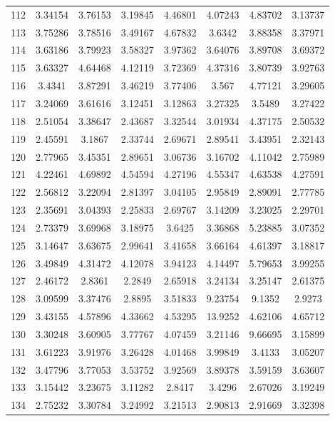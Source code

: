 \begin{center}
\begin{longtable}{cccccccc}
112 & 3.34154 & 3.76153 & 3.19845 & 4.46801 & 4.07243 & 4.83702 & 3.13737\\
113 & 3.75286 & 3.78516 & 3.49167 & 4.67832 & 3.6342 & 3.88358 & 3.37971\\
114 & 3.63186 & 3.79923 & 3.58327 & 3.97362 & 3.64076 & 3.89708 & 3.69372\\
115 & 3.63327 & 4.64468 & 4.12119 & 3.72369 & 4.37316 & 3.80739 & 3.92763\\
116 & 3.4341 & 3.87291 & 3.46219 & 3.77406 & 3.567 & 4.77121 & 3.29605\\
117 & 3.24069 & 3.61616 & 3.12451 & 3.12863 & 3.27325 & 3.5489 & 3.27422\\
118 & 2.51054 & 3.38647 & 2.43687 & 3.32544 & 3.01934 & 4.37175 & 2.50532\\
119 & 2.45591 & 3.1867 & 2.33744 & 2.69671 & 2.89541 & 3.43951 & 2.32143\\
120 & 2.77965 & 3.45351 & 2.89651 & 3.06736 & 3.16702 & 4.11042 & 2.75989\\
121 & 4.22461 & 4.69892 & 4.54594 & 4.27196 & 4.55347 & 4.63538 & 4.27591\\
122 & 2.56812 & 3.22094 & 2.81397 & 3.04105 & 2.95849 & 2.89091 & 2.77785\\
123 & 2.35691 & 3.04393 & 2.25833 & 2.69767 & 3.14209 & 3.23025 & 2.29701\\
124 & 2.73379 & 3.69968 & 3.18975 & 3.6425 & 3.36868 & 5.23885 & 3.07352\\
125 & 3.14647 & 3.63675 & 2.99641 & 3.41658 & 3.66164 & 4.61397 & 3.18817\\
126 & 3.49849 & 4.31472 & 4.12078 & 3.94123 & 4.14497 & 5.79653 & 3.99255\\
127 & 2.46172 & 2.8361 & 2.2849 & 2.65918 & 3.24134 & 3.25147 & 2.61375\\
128 & 3.09599 & 3.37476 & 2.8895 & 3.51833 & 9.23754 & 9.1352 & 2.9273\\
129 & 3.43155 & 4.57896 & 4.33662 & 4.53295 & 13.9252 & 4.62106 & 4.65712\\
130 & 3.30248 & 3.60905 & 3.77767 & 4.07459 & 3.21146 & 9.66695 & 3.15899\\
131 & 3.61223 & 3.91976 & 3.26428 & 4.01468 & 3.99849 & 3.4133 & 3.05207\\
132 & 3.47796 & 3.77053 & 3.53752 & 3.92569 & 3.89378 & 3.59159 & 3.63607\\
133 & 3.15442 & 3.23675 & 3.11282 & 2.8417 & 3.4296 & 2.67026 & 3.19249\\
134 & 2.75232 & 3.30784 & 3.24992 & 3.21513 & 2.90813 & 2.91669 & 3.32398\\

\end{longtable}
\end{center}
